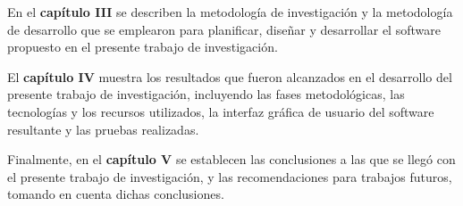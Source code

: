 	En el \textbf{cap\'{i}tulo III} se describen la metodolog\'{i}a de investigaci\'{o}n y la metodolog\'{i}a de desarrollo que se emplearon para planificar, dise\~{n}ar y desarrollar el software propuesto en el presente trabajo de investigaci\'{o}n.

	El \textbf{cap\'{i}tulo IV} muestra los resultados que fueron alcanzados en el desarrollo del presente trabajo de investigaci\'{o}n, incluyendo las fases metodol\'{o}gicas, las tecnolog\'{i}as y los recursos utilizados, la interfaz gr\'{a}fica de usuario del software resultante y las pruebas realizadas.

	Finalmente, en el \textbf{cap\'{i}tulo V} se establecen las conclusiones a las que se lleg\'{o} con el presente trabajo de investigaci\'{o}n, y las recomendaciones para trabajos futuros, tomando en cuenta dichas conclusiones.

	
	